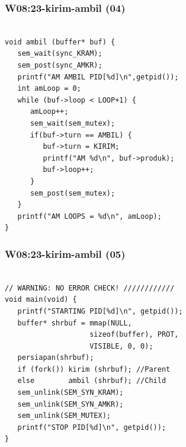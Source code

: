 \documentclass[aspectratio=169, xcolor=table, notheorems, hyperref={pdfpagelabels=false}]{beamer}
\begin{document}
\begin{frame}[fragile]
\frametitle{W08:23-kirim-ambil (04)}
\begin{lstlisting}[basicstyle=\ttfamily\small]        %  65
% \begin{lstlisting}[basicstyle=\ttfamily\large]        %  54

void ambil (buffer* buf) {
   sem_wait(sync_KRAM);
   sem_post(sync_AMKR);
   printf("AM AMBIL PID[%d]\n",getpid());
   int amLoop = 0;
   while (buf->loop < LOOP+1) {
      amLoop++;
      sem_wait(sem_mutex);
      if(buf->turn == AMBIL) {
         buf->turn = KIRIM;
         printf("AM %d\n", buf->produk);
         buf->loop++;
      }
      sem_post(sem_mutex);
   }
   printf("AM LOOPS = %d\n", amLoop);
}

\end{lstlisting}
\end{frame}

\begin{frame}[fragile]
\frametitle{W08:23-kirim-ambil (05)}
\begin{lstlisting}[basicstyle=\ttfamily\large]        %  54

// WARNING: NO ERROR CHECK! ////////////
void main(void) {
   printf("STARTING PID[%d]\n", getpid());
   buffer* shrbuf = mmap(NULL,
                    sizeof(buffer), PROT, 
                    VISIBLE, 0, 0);
   persiapan(shrbuf);
   if (fork()) kirim (shrbuf); //Parent
   else        ambil (shrbuf); //Child
   sem_unlink(SEM_SYN_KRAM);
   sem_unlink(SEM_SYN_AMKR);
   sem_unlink(SEM_MUTEX);
   printf("STOP PID[%d]\n", getpid());
}


\end{lstlisting}
\end{frame}
\end{document}
